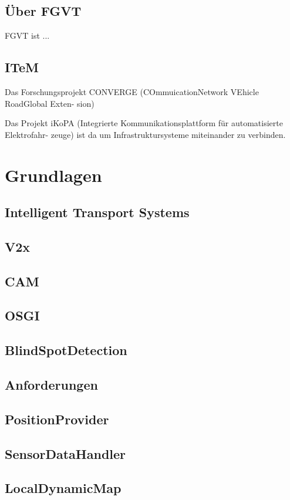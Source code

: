 \documentclass[15pt]{scrartcl}
\begin{document}
\subsection{Über FGVT}
 FGVT ist ...
\subsection{ITeM}
 Das Forschungsprojekt CONVERGE (COmmuicationNetwork VEhicle   RoadGlobal Exten-
sion) 

Das Projekt iKoPA (Integrierte Kommunikationsplattform für automatisierte Elektrofahr-
zeuge) ist da um Infrastruktursysteme miteinander zu verbinden.



\newpage
\section{Grundlagen}
\subsection{Intelligent Transport Systems}
\subsection{V2x}
\subsection{CAM}
\subsection{OSGI}
\subsection{BlindSpotDetection}
\subsection{Anforderungen}
\subsection{PositionProvider}
\subsection{SensorDataHandler}
\subsection{LocalDynamicMap}
\end{document}
